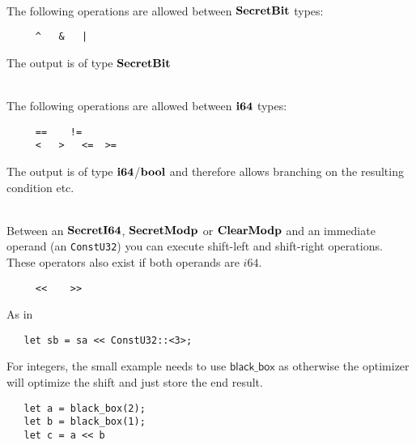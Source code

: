 ~ \\

\noindent
The following operations are allowed between $\mathbf{SecretBit}$ types:
\begin{verbatim}
     ^   &   |
\end{verbatim}
The output is of type $\mathbf{SecretBit}$

~\\

\noindent
The following operations are allowed between $\mathbf{i64}$ types:
\begin{verbatim}
     ==    !=
     <   >   <=  >=
\end{verbatim}
The output is of type $\mathbf{i64}$/$\mathbf{bool}$ and therefore allows branching
on the resulting condition etc.


~ \\

\noindent
Between an $\mathbf{SecretI64}$, $\mathbf{SecretModp}$ or $\mathbf{ClearModp}$ and an immediate operand (an \verb|ConstU32|)
you can execute shift-left and shift-right operations. These operators also exist if both operands
are $i64$.
\begin{verbatim}
     <<    >>
\end{verbatim}
As in
\begin{lstlisting}
   let sb = sa << ConstU32::<3>;
\end{lstlisting}
For integers, the small example needs to use $\mathsf{black\_box}$ 
as otherwise the optimizer will optimize the shift and just store 
the end result.
\begin{lstlisting}
   let a = black_box(2);
   let b = black_box(1);
   let c = a << b
\end{lstlisting}


~ \\


